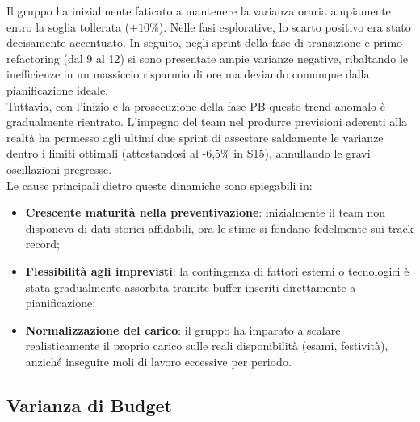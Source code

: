 \documentclass[a4paper,11pt,oneside]{scrartcl}
\begin{document}
Il gruppo ha inizialmente faticato a mantenere la varianza oraria ampiamente entro la soglia tollerata ($\pm 10\%$). Nelle fasi esplorative, lo scarto positivo era stato decisamente accentuato. In seguito, negli sprint della fase di transizione e primo refactoring (dal 9 al 12) si sono presentate ampie varianze negative, ribaltando le inefficienze in un massiccio risparmio di ore ma deviando comunque dalla pianificazione ideale.\\
Tuttavia, con l'inizio e la prosecuzione della fase PB questo trend anomalo è gradualmente rientrato. L'impegno del team nel produrre previsioni aderenti alla realtà ha permesso agli ultimi due sprint di assestare saldamente le varianze dentro i limiti ottimali (attestandosi al -6,5\% in S15), annullando le gravi oscillazioni pregresse.\\
Le cause principali dietro queste dinamiche sono spiegabili in:
\begin{itemize}
    \item \textbf{Crescente maturità nella preventivazione}: inizialmente il team non disponeva di dati storici affidabili, ora le stime si fondano fedelmente sui track record;
    \item \textbf{Flessibilità agli imprevisti}: la contingenza di fattori esterni o tecnologici è stata gradualmente assorbita tramite buffer inseriti direttamente a pianificazione;
    \item \textbf{Normalizzazione del carico}: il gruppo ha imparato a scalare realisticamente il proprio carico sulle reali disponibilità (esami, festività), anziché inseguire moli di lavoro eccessive per periodo.
\end{itemize}

\subsection{Varianza di Budget}
\end{document}
